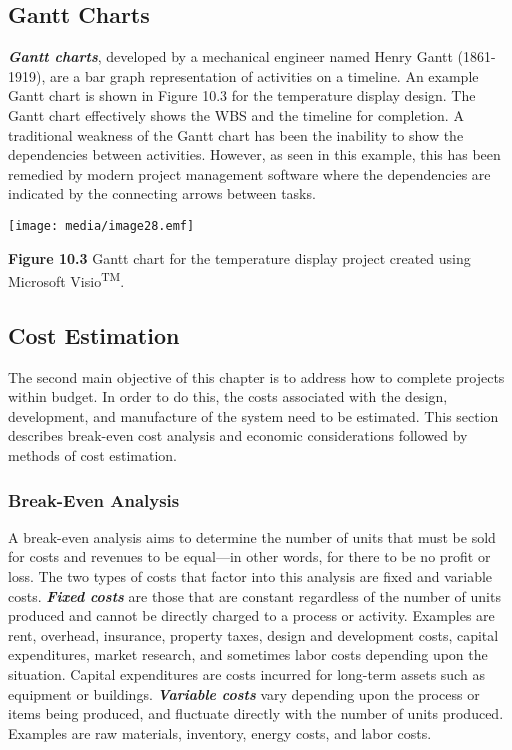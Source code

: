 \subsection{Gantt Charts}\label{gantt-charts}

\emph{\textbf{Gantt charts}}, developed by a mechanical engineer named
Henry Gantt (1861-1919), are a bar graph representation of activities on
a timeline. An example Gantt chart is shown in Figure 10.3 for the
temperature display design. The Gantt chart effectively shows the WBS
and the timeline for completion. A traditional weakness of the Gantt
chart has been the inability to show the dependencies between
activities. However, as seen in this example, this has been remedied by
modern project management software where the dependencies are indicated
by the connecting arrows between tasks.

\texttt{[image: media/image28.emf]}

\textbf{Figure 10.3} Gantt chart for the temperature display project
created using Microsoft Visio\textsuperscript{TM}.

\subsection{Cost Estimation}\label{cost-estimation}

The second main objective of this chapter is to address how to complete
projects within budget. In order to do this, the costs associated with
the design, development, and manufacture of the system need to be
estimated. This section describes break-even cost analysis and economic
considerations followed by methods of cost estimation.

\subsubsection{Break-Even Analysis}\label{break-even-analysis}

A break-even analysis aims to determine the number of units that must be
sold for costs and revenues to be equal---in other words, for there to
be no profit or loss. The two types of costs that factor into this
analysis are fixed and variable costs. \emph{\textbf{Fixed costs}} are
those that are constant regardless of the number of units produced and
cannot be directly charged to a process or activity. Examples are rent,
overhead, insurance, property taxes, design and development costs,
capital expenditures, market research, and sometimes labor costs
depending upon the situation. Capital expenditures are costs incurred
for long-term assets such as equipment or buildings.
\emph{\textbf{Variable costs}} vary depending upon the process or items
being produced, and fluctuate directly with the number of units
produced. Examples are raw materials, inventory, energy costs, and labor
costs.


